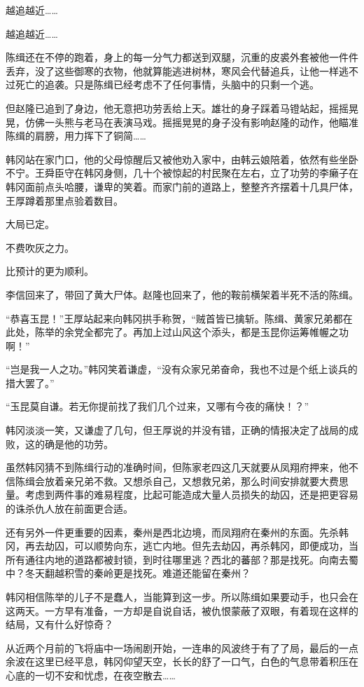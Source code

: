 越追越近……

越追越近……

陈缉还在不停的跑着，身上的每一分气力都送到双腿，沉重的皮裘外套被他一件件丢弃，没了这些御寒的衣物，他就算能逃进树林，寒风会代替追兵，让他一样逃不过死亡的追袭。只是陈缉已经考虑不了任何事情，头脑中的只剩一个逃。

但赵隆已追到了身边，他无意把功劳丢给上天。雄壮的身子踩着马镫站起，摇摇晃晃，仿佛一头熊与老马在表演马戏。摇摇晃晃的身子没有影响赵隆的动作，他瞄准陈缉的肩膀，用力挥下了铜简……

韩冈站在家门口，他的父母惊醒后又被他劝入家中，由韩云娘陪着，依然有些坐卧不宁。王舜臣守在韩冈身侧，几十个被惊起的村民聚在左右，立了功劳的李癞子在韩冈面前点头哈腰，谦卑的笑着。而家门前的道路上，整整齐齐摆着十几具尸体，王厚蹲着那里点验着数目。

大局已定。

不费吹灰之力。

比预计的更为顺利。

李信回来了，带回了黄大尸体。赵隆也回来了，他的鞍前横架着半死不活的陈缉。

“恭喜玉昆！”王厚站起来向韩冈拱手称贺，“贼首皆已擒斩。陈缉、黄家兄弟都在此处，陈举的余党全都完了。再加上过山风这个添头，都是玉昆你运筹帷幄之功啊！”

“岂是我一人之功。”韩冈笑着谦虚，“没有众家兄弟奋命，我也不过是个纸上谈兵的措大罢了。”

“玉昆莫自谦。若无你提前找了我们几个过来，又哪有今夜的痛快！？”

韩冈淡淡一笑，又谦虚了几句，但王厚说的并没有错，正确的情报决定了战局的成败，这的确是他的功劳。

虽然韩冈猜不到陈缉行动的准确时间，但陈家老四这几天就要从凤翔府押来，他不信陈缉会放着亲兄弟不救。又想杀自己，又想救兄弟，那么时间安排就要大费思量。考虑到两件事的难易程度，比起可能造成大量人员损失的劫囚，还是把更容易的诛杀仇人放在前面更合适。

还有另外一件更重要的因素，秦州是西北边境，而凤翔府在秦州的东面。先杀韩冈，再去劫囚，可以顺势向东，逃亡内地。但先去劫囚，再杀韩冈，即便成功，当所有通往内地的道路都被封锁，到时往哪里逃？西北的蕃部？那是找死。向南去蜀中？冬天翻越积雪的秦岭更是找死。难道还能留在秦州？

韩冈相信陈举的儿子不是蠢人，当能算到这一步。所以陈缉如果要动手，也只会在这两天。一方早有准备，一方却是自说自话，被仇恨蒙蔽了双眼，有着现在这样的结局，又有什么好惊奇？

从近两个月前的飞将庙中一场闹剧开始，一连串的风波终于有了了局，最后的一点余波在这里已经平息，韩冈仰望天空，长长的舒了一口气，白色的气息带着积压在心底的一切不安和忧虑，在夜空散去……

